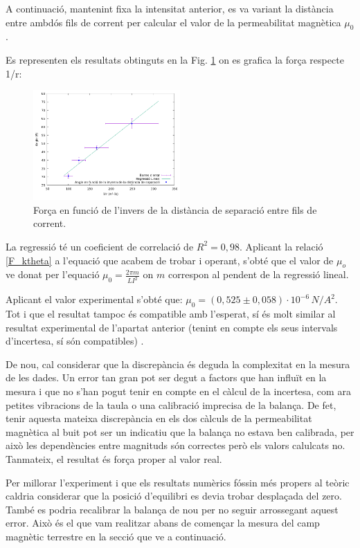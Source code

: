 \documentclass[11pt]{article}
\numberwithin{equation}{section}
\numberwithin{figure}{section}
\numberwithin{table}{section}
\begin{document}
A continuació, mantenint fixa la intensitat anterior, es va variant la distància entre ambdós fils de corrent per calcular el valor de la permeabilitat magnètica $\mu_0$. 

Es representen els resultats obtinguts en la Fig. \ref{fig: PR2_regr_thetavsr} on es grafica la força respecte 1/r:

\begin{figure}[H]
    \centering
    \includegraphics[width=0.5\textwidth]{PR2_regr_thetavsr.png}
    \caption{Força en funció de l’invers de la distància de separació entre fils de corrent.}
    \label{fig: PR2_regr_thetavsr}
\end{figure}

La regressió té un coeficient de correlació de $R^2 = 0,98$.
Aplicant la relació \eqref{F_ktheta} a l'equació que acabem de trobar i operant, s’obté que el valor de $\mu_o$ ve donat per l’equació $\mu_0 = \frac{2πm}{LI^2}$ on $m$ correspon al pendent de la regressió lineal. 

Aplicant el valor experimental s’obté que: $\mu_0 = (0,525 \pm 0,058) \cdot 10^{-6}\, N/A^2$. Tot i que el resultat tampoc és compatible amb l’esperat, sí és molt similar al resultat experimental de l’apartat anterior (tenint en compte els seus intervals d'incertesa, sí són compatibles) . 

De nou, cal considerar que la discrepància és deguda la complexitat en la mesura de les dades. Un error tan gran pot ser degut a factors que han influït en la mesura i que no s’han pogut tenir en compte en el càlcul de la incertesa, com ara petites vibracions de la taula o una calibració imprecisa de la balança. De fet, tenir aquesta mateixa discrepància en els dos càlculs de la permeabilitat magnètica al buit pot ser un indicatiu que la balança no estava ben calibrada, per això les dependències entre magnituds són correctes però els valors calulcats no. Tanmateix, el resultat és força proper al valor real.

Per millorar l'experiment i que els resultats numèrics fóssin més propers al teòric caldria considerar que la posició d'equilibri es devia trobar desplaçada del zero. També es podria recalibrar la balança de nou per no seguir arrossegant aquest error. Això és el que vam realitzar abans de començar la mesura del camp magnètic terrestre en la secció que ve a continuació.
\end{document}
